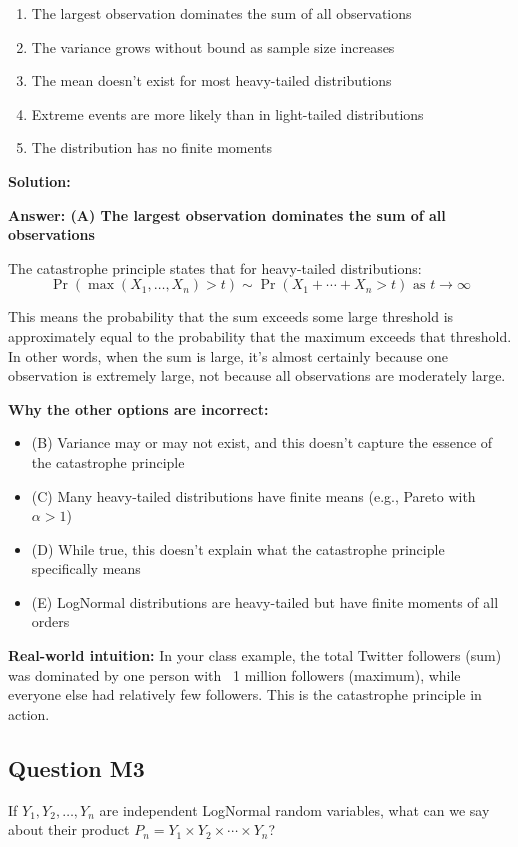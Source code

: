 \documentclass[11pt]{article}
\newenvironment{solution}
{\color{solutioncolor}\begin{framed}\textbf{Solution:}\par}
{\end{framed}}
\begin{document}
\begin{enumerate}[label=(\Alph*)]
\item The largest observation dominates the sum of all observations
\item The variance grows without bound as sample size increases
\item The mean doesn't exist for most heavy-tailed distributions
\item Extreme events are more likely than in light-tailed distributions
\item The distribution has no finite moments
\end{enumerate}

\begin{solution}
\textbf{Answer: (A) The largest observation dominates the sum of all observations}

The catastrophe principle states that for heavy-tailed distributions:
$$\Pr(\max(X_1, \ldots, X_n) > t) \sim \Pr(X_1 + \cdots + X_n > t) \text{ as } t \to \infty$$

This means the probability that the sum exceeds some large threshold is approximately equal to the probability that the maximum exceeds that threshold. In other words, when the sum is large, it's almost certainly because one observation is extremely large, not because all observations are moderately large.

\textbf{Why the other options are incorrect:}
\begin{itemize}
\item (B) Variance may or may not exist, and this doesn't capture the essence of the catastrophe principle
\item (C) Many heavy-tailed distributions have finite means (e.g., Pareto with $\alpha > 1$)
\item (D) While true, this doesn't explain what the catastrophe principle specifically means
\item (E) LogNormal distributions are heavy-tailed but have finite moments of all orders
\end{itemize}

\textbf{Real-world intuition:} In your class example, the total Twitter followers (sum) was dominated by one person with ~1 million followers (maximum), while everyone else had relatively few followers. This is the catastrophe principle in action.
\end{solution}

\subsection{Question M3}
If $Y_1, Y_2, \ldots, Y_n$ are independent LogNormal random variables, what can we say about their product $P_n = Y_1 \times Y_2 \times \cdots \times Y_n$?
\end{document}
